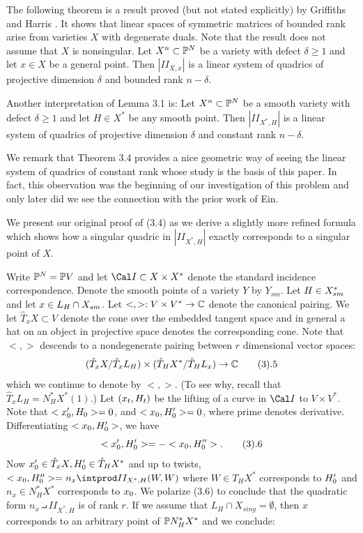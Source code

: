 The following theorem is a result proved (but not stated explicitly) by
Griffiths and Harris \cite{GH2, 3.5}. It shows that linear spaces of
symmetric matrices of bounded rank arise from varieties 
$X$ with degenerate duals. Note that the result does not assume that
$X$ is nonsingular. 
 \cite{Lan, 5.2}
Let $X^n\subset\Bbb P^{N}$ be a  variety with defect $\delta \ge 1$ and let
$x\in X$ be a general point. Then
$|II_{X,x}|$ is a linear system of quadrics of projective dimension
$\delta$ and bounded rank $n - \delta$.
\endproclaim

Another interpretation of Lemma 3.1 is:  
Let $X^n \subset \Bbb P^{N}$ be a smooth variety with defect $\delta \ge 1$ 
and let $H\in X^*$ be any smooth point. Then
$|II_{X^*,H}|$ is a linear system of quadrics of projective dimension
$\delta$ and constant rank $n-\delta$.
\endproclaim

We remark that Theorem 3.4 provides a nice geometric way of seeing the
linear system of quadrics of constant rank whose study is the basis
of this paper. In fact, this observation was the beginning of our 
investigation of this problem and only later did we see the connection
with the prior work of Ein. 

We present our original proof of (3.4) as 
we derive a slightly more refined formula which shows how
a singular quadric in $|II_{X^*,H}|$ exactly corresponds
to a singular point of $X$.

Write $\Bbb P^{N}=\Bbb P V$ and 
let $\ci\subset X\times X^*$ denote
the standard  incidence correspondence.
Denote the smooth points of a variety $Y$ by
$Y_{sm}$. Let $H\in X_{sm}^*$ and
let $x\in L_H\cap X_{sm}$.
Let $<,>: V\times V^*\rightarrow \Bbb C$ denote the canonical pairing.
We let $\hat T_xX\subset V$ denote the
cone over the embedded tangent space and in general a hat on
an object in projective space denotes the corresponding cone. 
Note that $<,>$ descends to   a    
  nondegenerate pairing between
$r$ dimensional vector spaces:
$$
(\hat T_xX/\hat T_xL_H)\times (\hat T_HX^*/\hat  T_HL_x)\ra \Bbb C \tag 3.5
$$
which we continue to denote by $<,>$.
(To see why, recall that $\hat T_xL_H= N^*_HX^*(1)$.)
Let $(x_{t},H_{t})$ be the lifting of a curve in
$\ci$ to $V\times V^*$. Note that
$<x_{0}',H_{0}>=0$, and
$ <x_{0},H_{0}'>=0$, where prime denotes derivative.
Differentiating $<x_{0},H_{0}'>$, 
  we have
$$
<\lx 0',\lh 0'>=- 
<\lx 0,\lh 0''>.\tag 3.6
$$
Now $x_{0}'\in \hat T_xX, H_{0}'\in \hat T_HX^*$ and
up to twists, 
$<\lx 0,\lh 0''>= n_x\intprod II_{X^*,H}(W,W)$
where $W\in T_HX^*$ corresponds to $H_{0}'$
and $n_x\in N^*_HX^*$ corresponds to $x_{0}$.
We polarize (3.6) to conclude that the quadratic form
$n_x\intprod II_{X^*,H}$ is of rank $r$. If we assume
that
  $L_H\cap X_{sing}=\emptyset$, then
$x$ corresponds to an arbitrary point of $\Bbb P N^*_HX^*$
and we conclude:

